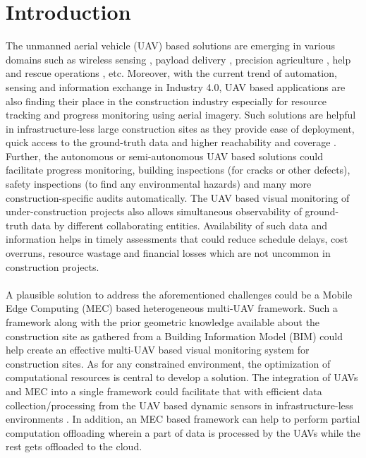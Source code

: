\documentclass[twocolumn]{article}
\begin{document}
\section{Introduction}
The unmanned aerial vehicle (UAV) based solutions are
emerging in various domains such as wireless sensing \cite{mozaffari2019tutorial},
payload delivery \cite{ruggiero2018aerial}, precision agriculture \cite{boursianis2020internet}, help and
rescue operations \cite{waharte2010supporting}, etc. Moreover, with the current
trend of automation, sensing and information exchange in Industry 4.0, UAV based applications are also finding
their place in the construction industry especially for resource tracking and progress monitoring using aerial imagery. Such solutions are helpful in infrastructure-less
large construction sites as they provide ease of deployment, quick access to the ground-truth data and higher
reachability and coverage \cite{hamledari2018uav}. Further, the autonomous
or semi-autonomous UAV based solutions could facilitate
progress monitoring, building inspections (for cracks or
other defects), safety inspections (to find any environmental hazards) and many more construction-specific audits automatically. The UAV based visual monitoring of
under-construction projects also allows simultaneous observability of ground-truth data by different collaborating
entities. Availability of such data and information helps
in timely assessments that could reduce schedule delays,
cost overruns, resource wastage and financial losses which
are not uncommon in construction projects.
\\
\\
A plausible solution to address the aforementioned
challenges could be a Mobile Edge Computing (MEC)
\cite{mao2017survey} based heterogeneous multi-UAV framework. Such a
framework along with the prior geometric knowledge available about the construction site as gathered from a Building Information Model (BIM)\cite{golparvar2011integrated} could help create an effective multi-UAV based visual monitoring system for construction sites. As for any constrained environment, the
optimization of computational resources is central to develop a solution. The integration of UAVs and MEC into
a single framework could facilitate that with efficient data
collection/processing from the UAV based dynamic sensors in infrastructure-less environments \cite{nguyen2020towards}. In addition,
an MEC based framework can help to perform partial
computation offloading wherein a part of data is processed
by the UAVs while the rest gets offloaded to the cloud.
\end{document}
